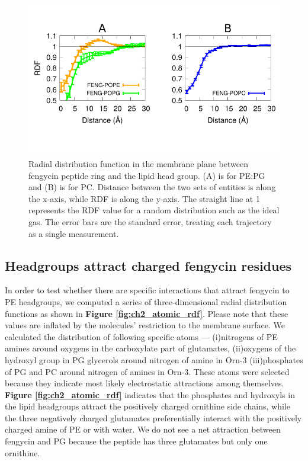 \begin{figure}
\centering
\includegraphics[width=1.0\textwidth]{chapter2_figs/feng_mem_corr.pdf}
\caption{\label{fig:ch2_xyrdf_mem} Radial distribution function in the membrane plane between
fengycin peptide ring and the lipid head group. (A) is for PE:PG and (B) is for PC.
Distance between the two sets of entities
is along the x-axis, while RDF is along the y-axis.
The straight line at 1 represents the RDF value for a
random distribution such as the ideal gas. The error bars are the standard error, treating each trajectory as a single measurement.
}
\end{figure}

\subsection{Headgroups attract charged fengycin residues}
\label{subsec:atomicrdf}
In order to test whether there are specific interactions that attract fengycin
to PE headgroups, we computed a series of three-dimensional radial distribution
functions as shown in \textbf{Figure \ref{fig:ch2_atomic_rdf}}.
 Please note that these values are inflated by the molecules' restriction to the membrane surface.
 We calculated the distribution of following specific atoms ---
(i)nitrogens of PE amines around oxygens in the carboxylate part of glutamates,
(ii)oxygens of the hydroxyl group in PG glycerols around nitrogen of amine in Orn-3
(iii)phosphates of PG and PC around nitrogen of amines in Orn-3.
These atoms were selected because they indicate most likely electrostatic attractions among themselves.
\textbf{Figure \ref{fig:ch2_atomic_rdf}} indicates that the phosphates and
hydroxyls in the lipid headgroups attract the positively charged ornithine side
chains, while the three negatively charged glutamates preferentially interact
with the positively charged amine of PE or with water. We do not see a net
attraction between fengycin and PG because the peptide has three glutamates but only
one ornithine.

